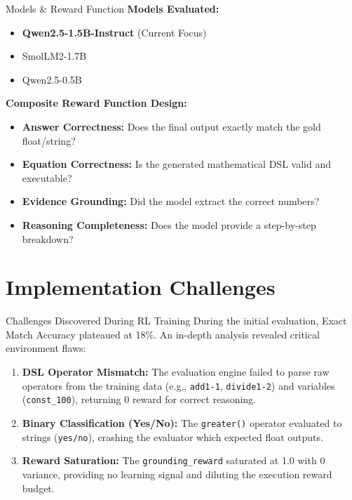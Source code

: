 \documentclass[aspectratio=169]{beamer}
\begin{document}
\begin{frame}{Models \& Reward Function}
    \textbf{Models Evaluated:}
    \begin{itemize}
        \item \textbf{Qwen2.5-1.5B-Instruct} (Current Focus)
        \item SmolLM2-1.7B
        \item Qwen2.5-0.5B
    \end{itemize}
    
    \vspace{0.3cm}
    \textbf{Composite Reward Function Design:}
    \begin{itemize}
        \item \textbf{Answer Correctness:} Does the final output exactly match the gold float/string?
        \item \textbf{Equation Correctness:} Is the generated mathematical DSL valid and executable?
        \item \textbf{Evidence Grounding:} Did the model extract the correct numbers?
        \item \textbf{Reasoning Completeness:} Does the model provide a step-by-step breakdown?
    \end{itemize}
\end{frame}

\section{Implementation Challenges}
\begin{frame}{Challenges Discovered During RL Training}
    During the initial evaluation, Exact Match Accuracy plateaued at 18\%. An in-depth analysis revealed critical environment flaws:
    \begin{enumerate}
        \item \textbf{DSL Operator Mismatch:} The evaluation engine failed to parse raw operators from the training data (e.g., \texttt{add1-1}, \texttt{divide1-2}) and variables (\texttt{const\_100}), returning 0 reward for correct reasoning.
        \item \textbf{Binary Classification (Yes/No):} The \texttt{greater()} operator evaluated to strings (\texttt{yes/no}), crashing the evaluator which expected float outputs.
        \item \textbf{Reward Saturation:} The \texttt{grounding\_reward} saturated at 1.0 with 0 variance, providing no learning signal and diluting the execution reward budget.
    \end{enumerate}
\end{frame}
\end{document}
